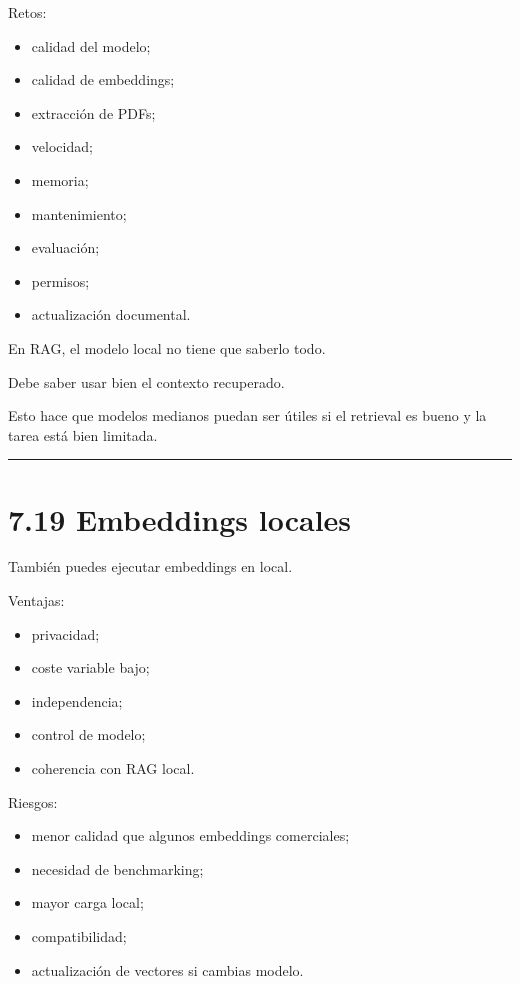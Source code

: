 Retos:

\begin{itemize}
\tightlist
\item
  calidad del modelo;
\item
  calidad de embeddings;
\item
  extracción de PDFs;
\item
  velocidad;
\item
  memoria;
\item
  mantenimiento;
\item
  evaluación;
\item
  permisos;
\item
  actualización documental.
\end{itemize}

En RAG, el modelo local no tiene que saberlo todo.

Debe saber usar bien el contexto recuperado.

Esto hace que modelos medianos puedan ser útiles si el retrieval es
bueno y la tarea está bien limitada.

\begin{center}\rule{0.5\linewidth}{0.5pt}\end{center}

\section{7.19 Embeddings locales}\label{embeddings-locales}

También puedes ejecutar embeddings en local.

Ventajas:

\begin{itemize}
\tightlist
\item
  privacidad;
\item
  coste variable bajo;
\item
  independencia;
\item
  control de modelo;
\item
  coherencia con RAG local.
\end{itemize}

Riesgos:

\begin{itemize}
\tightlist
\item
  menor calidad que algunos embeddings comerciales;
\item
  necesidad de benchmarking;
\item
  mayor carga local;
\item
  compatibilidad;
\item
  actualización de vectores si cambias modelo.
\end{itemize}

